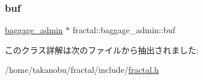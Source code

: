 \mbox{\label{classfractal_1_1baggage__admin_a318bc60961b007f5430f859a6c9bba75}} 
\subsubsection{\texorpdfstring{buf}{buf}}
{\footnotesize\ttfamily \hyperlink{classfractal_1_1baggage__admin}{baggage\+\_\+admin} $\ast$ fractal\+::baggage\+\_\+admin\+::buf\hspace{0.3cm}{\ttfamily [static]}}



このクラス詳解は次のファイルから抽出されました\+:\begin{DoxyCompactItemize}
\item 
/home/takanobu/fractal/include/\hyperlink{fractal_8h}{fractal.\+h}\end{DoxyCompactItemize}

